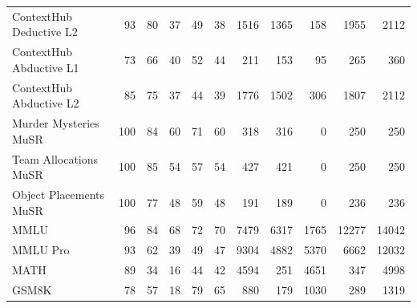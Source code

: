 \documentclass[11pt]{article}
\begin{document}
\begin{table}[htbp]
{\begin{tabular}{lrrrrrrrrrr}
 ContextHub Deductive L2 &      93 &              80 &           37 &        49 &        38 &             1516 &         1365 &            158 &              1955 &    2112 \\
 ContextHub Abductive L1 &      73 &              66 &           40 &        52 &        44 &              211 &          153 &             95 &               265 &     360 \\
 ContextHub Abductive L2 &      85 &              75 &           37 &        44 &        39 &             1776 &         1502 &            306 &              1807 &    2112 \\
 Murder Mysteries MuSR   &     100 &              84 &           60 &        71 &        60 &              318 &          316 &              0 &               250 &     250 \\
 Team Allocations MuSR   &     100 &              85 &           54 &        57 &        54 &              427 &          421 &              0 &               250 &     250 \\
 Object Placements MuSR  &     100 &              77 &           48 &        59 &        48 &              191 &          189 &              0 &               236 &     236 \\
 MMLU                    &      96 &              84 &           68 &        72 &        70 &             7479 &         6317 &           1765 &             12277 &   14042 \\
 MMLU Pro                &      93 &              62 &           39 &        49 &        47 &             9304 &         4882 &           5370 &              6662 &   12032 \\
 MATH                    &      89 &              34 &           16 &        44 &        42 &             4594 &          251 &           4651 &               347 &    4998 \\
 GSM8K                   &      78 &              57 &           18 &        79 &        65 &              880 &          179 &           1030 &               289 &    1319 \\
\bottomrule
\end{tabular}
}
\end{table}
\end{document}
